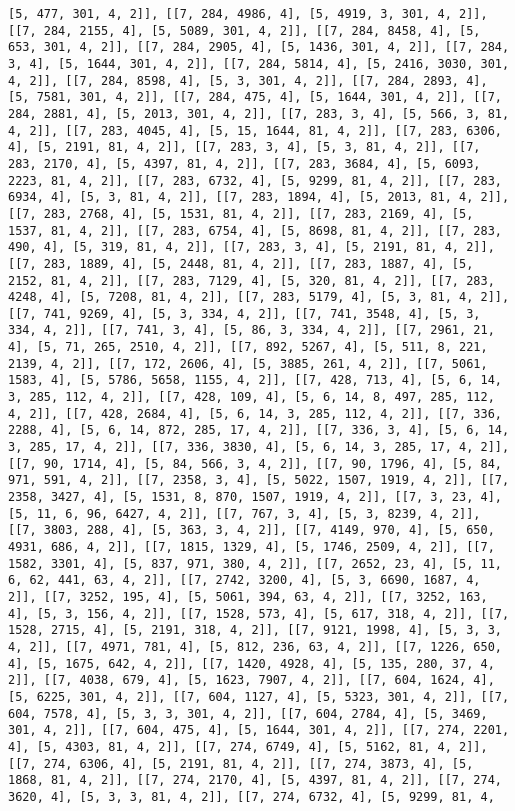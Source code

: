 \documentclass[12pt,fleqn]{article}\usepackage{../../common}
\begin{document}
\begin{verbatim}
[5, 477, 301, 4, 2]], [[7, 284, 4986, 4], [5, 4919, 3, 301, 4, 2]], [[7, 284, 2155, 4], [5, 5089, 301, 4, 2]], [[7, 284, 8458, 4], [5, 653, 301, 4, 2]], [[7, 284, 2905, 4], [5, 1436, 301, 4, 2]], [[7, 284, 3, 4], [5, 1644, 301, 4, 2]], [[7, 284, 5814, 4], [5, 2416, 3030, 301, 4, 2]], [[7, 284, 8598, 4], [5, 3, 301, 4, 2]], [[7, 284, 2893, 4], [5, 7581, 301, 4, 2]], [[7, 284, 475, 4], [5, 1644, 301, 4, 2]], [[7, 284, 2881, 4], [5, 2013, 301, 4, 2]], [[7, 283, 3, 4], [5, 566, 3, 81, 4, 2]], [[7, 283, 4045, 4], [5, 15, 1644, 81, 4, 2]], [[7, 283, 6306, 4], [5, 2191, 81, 4, 2]], [[7, 283, 3, 4], [5, 3, 81, 4, 2]], [[7, 283, 2170, 4], [5, 4397, 81, 4, 2]], [[7, 283, 3684, 4], [5, 6093, 2223, 81, 4, 2]], [[7, 283, 6732, 4], [5, 9299, 81, 4, 2]], [[7, 283, 6934, 4], [5, 3, 81, 4, 2]], [[7, 283, 1894, 4], [5, 2013, 81, 4, 2]], [[7, 283, 2768, 4], [5, 1531, 81, 4, 2]], [[7, 283, 2169, 4], [5, 1537, 81, 4, 2]], [[7, 283, 6754, 4], [5, 8698, 81, 4, 2]], [[7, 283, 490, 4], [5, 319, 81, 4, 2]], [[7, 283, 3, 4], [5, 2191, 81, 4, 2]], [[7, 283, 1889, 4], [5, 2448, 81, 4, 2]], [[7, 283, 1887, 4], [5, 2152, 81, 4, 2]], [[7, 283, 7129, 4], [5, 320, 81, 4, 2]], [[7, 283, 4248, 4], [5, 7208, 81, 4, 2]], [[7, 283, 5179, 4], [5, 3, 81, 4, 2]], [[7, 741, 9269, 4], [5, 3, 334, 4, 2]], [[7, 741, 3548, 4], [5, 3, 334, 4, 2]], [[7, 741, 3, 4], [5, 86, 3, 334, 4, 2]], [[7, 2961, 21, 4], [5, 71, 265, 2510, 4, 2]], [[7, 892, 5267, 4], [5, 511, 8, 221, 2139, 4, 2]], [[7, 172, 2606, 4], [5, 3885, 261, 4, 2]], [[7, 5061, 1583, 4], [5, 5786, 5658, 1155, 4, 2]], [[7, 428, 713, 4], [5, 6, 14, 3, 285, 112, 4, 2]], [[7, 428, 109, 4], [5, 6, 14, 8, 497, 285, 112, 4, 2]], [[7, 428, 2684, 4], [5, 6, 14, 3, 285, 112, 4, 2]], [[7, 336, 2288, 4], [5, 6, 14, 872, 285, 17, 4, 2]], [[7, 336, 3, 4], [5, 6, 14, 3, 285, 17, 4, 2]], [[7, 336, 3830, 4], [5, 6, 14, 3, 285, 17, 4, 2]], [[7, 90, 1714, 4], [5, 84, 566, 3, 4, 2]], [[7, 90, 1796, 4], [5, 84, 971, 591, 4, 2]], [[7, 2358, 3, 4], [5, 5022, 1507, 1919, 4, 2]], [[7, 2358, 3427, 4], [5, 1531, 8, 870, 1507, 1919, 4, 2]], [[7, 3, 23, 4], [5, 11, 6, 96, 6427, 4, 2]], [[7, 767, 3, 4], [5, 3, 8239, 4, 2]], [[7, 3803, 288, 4], [5, 363, 3, 4, 2]], [[7, 4149, 970, 4], [5, 650, 4931, 686, 4, 2]], [[7, 1815, 1329, 4], [5, 1746, 2509, 4, 2]], [[7, 1582, 3301, 4], [5, 837, 971, 380, 4, 2]], [[7, 2652, 23, 4], [5, 11, 6, 62, 441, 63, 4, 2]], [[7, 2742, 3200, 4], [5, 3, 6690, 1687, 4, 2]], [[7, 3252, 195, 4], [5, 5061, 394, 63, 4, 2]], [[7, 3252, 163, 4], [5, 3, 156, 4, 2]], [[7, 1528, 573, 4], [5, 617, 318, 4, 2]], [[7, 1528, 2715, 4], [5, 2191, 318, 4, 2]], [[7, 9121, 1998, 4], [5, 3, 3, 4, 2]], [[7, 4971, 781, 4], [5, 812, 236, 63, 4, 2]], [[7, 1226, 650, 4], [5, 1675, 642, 4, 2]], [[7, 1420, 4928, 4], [5, 135, 280, 37, 4, 2]], [[7, 4038, 679, 4], [5, 1623, 7907, 4, 2]], [[7, 604, 1624, 4], [5, 6225, 301, 4, 2]], [[7, 604, 1127, 4], [5, 5323, 301, 4, 2]], [[7, 604, 7578, 4], [5, 3, 3, 301, 4, 2]], [[7, 604, 2784, 4], [5, 3469, 301, 4, 2]], [[7, 604, 475, 4], [5, 1644, 301, 4, 2]], [[7, 274, 2201, 4], [5, 4303, 81, 4, 2]], [[7, 274, 6749, 4], [5, 5162, 81, 4, 2]], [[7, 274, 6306, 4], [5, 2191, 81, 4, 2]], [[7, 274, 3873, 4], [5, 1868, 81, 4, 2]], [[7, 274, 2170, 4], [5, 4397, 81, 4, 2]], [[7, 274, 3620, 4], [5, 3, 3, 81, 4, 2]], [[7, 274, 6732, 4], [5, 9299, 81, 4, 
\end{verbatim}
\end{document}
